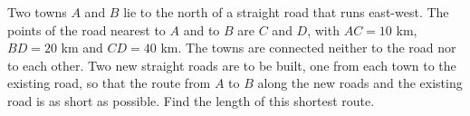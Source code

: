 Two towns $A$ and $B$ lie to the north of a straight road that runs east-west. The points of the road nearest to $A$ and to $B$ are $C$ and $D$, with $AC=10$ km, $BD=20$ km and $CD=40$ km. The towns are connected neither to the road nor to each other. Two new straight roads are to be built, one from each town to the existing road, so that the route from $A$ to $B$ along the new roads and the existing road is as short as possible. Find the length of this shortest route.
